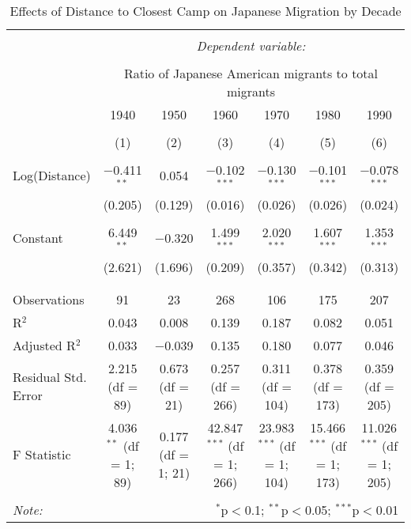
\begin{table}[!htbp] \centering 
  \caption{Effects of Distance to Closest Camp on Japanese Migration by Decade} 
  \label{} 
\begin{tabular}{@{\extracolsep{5pt}}lcccccc} 
\\[-1.8ex]\hline 
\hline \\[-1.8ex] 
 & \multicolumn{6}{c}{\textit{Dependent variable:}} \\ 
\cline{2-7} 
\\[-1.8ex] & \multicolumn{6}{c}{Ratio of Japanese American migrants to total migrants} \\ 
 & 1940 & 1950 & 1960 & 1970 & 1980 & 1990 \\ 
\\[-1.8ex] & (1) & (2) & (3) & (4) & (5) & (6)\\ 
\hline \\[-1.8ex] 
 Log(Distance) & $-$0.411$^{**}$ & 0.054 & $-$0.102$^{***}$ & $-$0.130$^{***}$ & $-$0.101$^{***}$ & $-$0.078$^{***}$ \\ 
  & (0.205) & (0.129) & (0.016) & (0.026) & (0.026) & (0.024) \\ 
  & & & & & & \\ 
 Constant & 6.449$^{**}$ & $-$0.320 & 1.499$^{***}$ & 2.020$^{***}$ & 1.607$^{***}$ & 1.353$^{***}$ \\ 
  & (2.621) & (1.696) & (0.209) & (0.357) & (0.342) & (0.313) \\ 
  & & & & & & \\ 
\hline \\[-1.8ex] 
Observations & 91 & 23 & 268 & 106 & 175 & 207 \\ 
R$^{2}$ & 0.043 & 0.008 & 0.139 & 0.187 & 0.082 & 0.051 \\ 
Adjusted R$^{2}$ & 0.033 & $-$0.039 & 0.135 & 0.180 & 0.077 & 0.046 \\ 
Residual Std. Error & 2.215 (df = 89) & 0.673 (df = 21) & 0.257 (df = 266) & 0.311 (df = 104) & 0.378 (df = 173) & 0.359 (df = 205) \\ 
F Statistic & 4.036$^{**}$ (df = 1; 89) & 0.177 (df = 1; 21) & 42.847$^{***}$ (df = 1; 266) & 23.983$^{***}$ (df = 1; 104) & 15.466$^{***}$ (df = 1; 173) & 11.026$^{***}$ (df = 1; 205) \\ 
\hline 
\hline \\[-1.8ex] 
\textit{Note:}  & \multicolumn{6}{r}{$^{*}$p$<$0.1; $^{**}$p$<$0.05; $^{***}$p$<$0.01} \\ 
\end{tabular} 
\end{table} 
